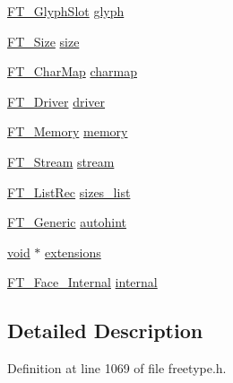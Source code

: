 \begin{DoxyCompactItemize}
\item 
\mbox{\hyperlink{freetype_8h_a768daa0d9c3fa499e6c37034ee9f2ca3}{F\+T\+\_\+\+Glyph\+Slot}} \mbox{\hyperlink{struct_f_t___face_rec___aea701e6584693e684acf300edb28d8f6}{glyph}}
\item 
\mbox{\hyperlink{freetype_8h_a791d0ff3273ca9628a523efd98d138c1}{F\+T\+\_\+\+Size}} \mbox{\hyperlink{struct_f_t___face_rec___a212d116864a5d81e80b176f9b846cd08}{size}}
\item 
\mbox{\hyperlink{freetype_8h_afc4717ddfd456a38ee15ec9c88fc7dac}{F\+T\+\_\+\+Char\+Map}} \mbox{\hyperlink{struct_f_t___face_rec___aca87d50488a5a1489741e8c13414c268}{charmap}}
\item 
\mbox{\hyperlink{freetype_8h_a5503c06c138ccdfeef486f2ce87bb8ec}{F\+T\+\_\+\+Driver}} \mbox{\hyperlink{struct_f_t___face_rec___a011b62fcffdd6dc421c9ab3286d4c9fa}{driver}}
\item 
\mbox{\hyperlink{ftsystem_8h_a67ec7ea35cde99a89a65e9f827a9ad3a}{F\+T\+\_\+\+Memory}} \mbox{\hyperlink{struct_f_t___face_rec___af269b241bfc2f570d485ab03fc0261b2}{memory}}
\item 
\mbox{\hyperlink{ftsystem_8h_a788b32c932932f7411a8dfa7f6c794bf}{F\+T\+\_\+\+Stream}} \mbox{\hyperlink{struct_f_t___face_rec___a831d5da25cd0fe2a783d2a73f467de55}{stream}}
\item 
\mbox{\hyperlink{fttypes_8h_ac01ed10278dab3cb3f046dba687b50ed}{F\+T\+\_\+\+List\+Rec}} \mbox{\hyperlink{struct_f_t___face_rec___a47504203e02bfba59c802c35cb4009ed}{sizes\+\_\+list}}
\item 
\mbox{\hyperlink{fttypes_8h_ae15e8550dd7d863328686aadaead5c77}{F\+T\+\_\+\+Generic}} \mbox{\hyperlink{struct_f_t___face_rec___a34ba9b1367f1b2d13676043b8da3ea73}{autohint}}
\item 
\mbox{\hyperlink{_s_d_l__opengles2__gl2ext_8h_ae5d8fa23ad07c48bb609509eae494c95}{void}} $\ast$ \mbox{\hyperlink{struct_f_t___face_rec___a8b24f993e38da597d3e0273267890f49}{extensions}}
\item 
\mbox{\hyperlink{freetype_8h_a1b0af221e2e374269fa3dc687a1e4023}{F\+T\+\_\+\+Face\+\_\+\+Internal}} \mbox{\hyperlink{struct_f_t___face_rec___aed9a1267cddcbe790f0591471c886537}{internal}}
\end{DoxyCompactItemize}


\subsection{Detailed Description}


Definition at line 1069 of file freetype.\+h.



